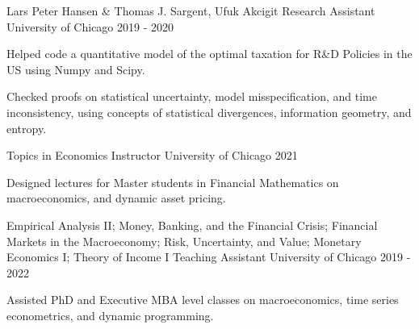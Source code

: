 

\begin{cventries}
	\cventry
	{Lars Peter Hansen \& Thomas J. Sargent, Ufuk Akcigit}
	{Research Assistant}
	{University of Chicago}
	{2019 - 2020}
	{\begin{cvitems}
			\item Helped code a quantitative model of the optimal taxation for R\&D Policies in the US using Numpy and Scipy.
			\item Checked proofs on statistical uncertainty, model misspecification, and time inconsistency, using concepts of statistical divergences, information geometry, and entropy.
		\end{cvitems}}

	\cventry
	{Topics in Economics}
	{Instructor}
	{University of Chicago}
	{2021}
	{\begin{cvitems}
			\item Designed lectures for Master students in Financial Mathematics on macroeconomics, and dynamic asset pricing.
		\end{cvitems}}

	\cventry
	{Empirical Analysis II; Money, Banking, and the Financial Crisis; Financial Markets in the Macroeconomy; Risk, Uncertainty, and Value; Monetary Economics I; Theory of Income I}
	{Teaching Assistant}
	{University of Chicago}
	{2019 - 2022}
	{\begin{cvitems}
			\item Assisted PhD and Executive MBA level classes on macroeconomics, time series econometrics, and dynamic programming.
		\end{cvitems}}
\end{cventries}
